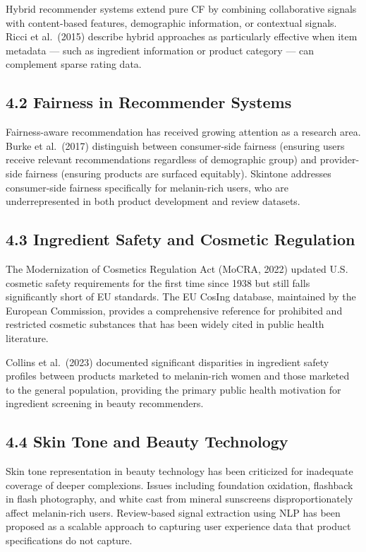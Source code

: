 \documentclass[
  letterpaper,
  DIV=11,
  numbers=noendperiod]{scrartcl}
\begin{document}
Hybrid recommender systems extend pure CF by combining collaborative
signals with content-based features, demographic information, or
contextual signals. Ricci et al.~(2015) describe hybrid approaches as
particularly effective when item metadata --- such as ingredient
information or product category --- can complement sparse rating data.

\subsection{4.2 Fairness in Recommender
Systems}\label{fairness-in-recommender-systems}

Fairness-aware recommendation has received growing attention as a
research area. Burke et al.~(2017) distinguish between consumer-side
fairness (ensuring users receive relevant recommendations regardless of
demographic group) and provider-side fairness (ensuring products are
surfaced equitably). Skintone addresses consumer-side fairness
specifically for melanin-rich users, who are underrepresented in both
product development and review datasets.

\subsection{4.3 Ingredient Safety and Cosmetic
Regulation}\label{ingredient-safety-and-cosmetic-regulation}

The Modernization of Cosmetics Regulation Act (MoCRA, 2022) updated U.S.
cosmetic safety requirements for the first time since 1938 but still
falls significantly short of EU standards. The EU CosIng database,
maintained by the European Commission, provides a comprehensive
reference for prohibited and restricted cosmetic substances that has
been widely cited in public health literature.

Collins et al.~(2023) documented significant disparities in ingredient
safety profiles between products marketed to melanin-rich women and
those marketed to the general population, providing the primary public
health motivation for ingredient screening in beauty recommenders.

\subsection{4.4 Skin Tone and Beauty
Technology}\label{skin-tone-and-beauty-technology}

Skin tone representation in beauty technology has been criticized for
inadequate coverage of deeper complexions. Issues including foundation
oxidation, flashback in flash photography, and white cast from mineral
sunscreens disproportionately affect melanin-rich users. Review-based
signal extraction using NLP has been proposed as a scalable approach to
capturing user experience data that product specifications do not
capture.
\end{document}
